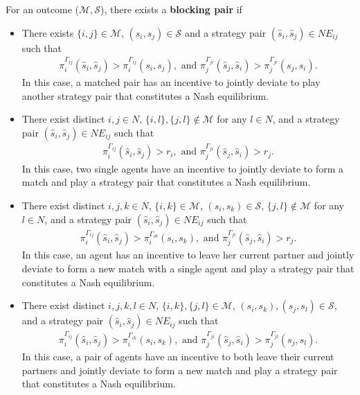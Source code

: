 \documentclass{myPaper}
\begin{document}
\begin{definition} \label{def:blocking}
For an outcome ($\mathcal{M}, \mathcal{S}$), there exists a \textbf{blocking pair} if
\begin{itemize}
    \item[(a)] There exists $\{i, j\} \in \mathcal{M}$, $(s_i, s_j) \in \mathcal{S}$ and a strategy pair $(\hat{s}_i,\hat{s}_j)\in NE_{ij}$ such that 
    \begin{eqnarray}
     \pi_i^{\Gamma_{ij}}(\hat{s}_i, \hat{s}_j)>\pi_i^{\Gamma_{ij}}(s_i, s_j), \text{ and } \pi_j^{\Gamma_{ji}}(\hat{s}_j, \hat{s}_i)>\pi_j^{\Gamma_{ji}}(s_j, s_i). \nonumber
\end{eqnarray}
In this case, a matched pair has an incentive to jointly deviate to play another strategy pair that constitutes a Nash equilibrium.

\item[(b)] There exist distinct $i, j \in N$,  $ \{i, l\}, \{j, l\} \notin \mathcal{M}$ for any $l \in N$, and a strategy pair $(\hat{s}_i,\hat{s}_j)\in NE_{ij}$ such that 
    \begin{eqnarray} \pi_i^{\Gamma_{ij}}(\hat{s}_i, \hat{s}_j)>r_i, \text{ and } \pi_j^{\Gamma_{ji}}(\hat{s}_j, \hat{s}_i)>r_j. \nonumber
\end{eqnarray}
In this case, two single agents have an incentive to jointly deviate to form a match and play a strategy pair that constitutes a Nash equilibrium.

\item[(c)] There exist distinct $i, j, k \in N$, $\{i, k\}\in \mathcal{M}$, $(s_i, s_k) \in \mathcal{S}$, $\{j, l\} \notin \mathcal{M}$ for any $l \in N$, and a strategy pair $(\hat{s}_i,\hat{s}_j)\in NE_{ij}$ such that 
    \begin{eqnarray}
 \pi_i^{\Gamma_{ij}}(\hat{s}_i, \hat{s}_j)>\pi_i^{\Gamma_{ik}}(s_i, s_k), \text{ and } \pi_j^{\Gamma_{ji}}(\hat{s}_j, \hat{s}_i)>r_j. \nonumber
\end{eqnarray}
In this case, an agent has an incentive to leave her current partner and jointly deviate to form a new match with a single agent and play a strategy pair that constitutes a Nash equilibrium.

\item[(d)] There exist distinct $i, j, k, l \in N$,  $\{i, k\}, \{j, l\} \in \mathcal{M}$, $(s_i, s_k), (s_j, s_l) \in \mathcal{S}$, and a strategy pair $(\hat{s}_i,\hat{s}_j)\in NE_{ij}$ such that
    \begin{eqnarray}
   \pi_i^{\Gamma_{ij}}(\hat{s}_i, \hat{s}_j)>\pi_i^{\Gamma_{ik}}(s_i, s_k), \text{ and } \pi_j^{\Gamma_{ji}}(\hat{s}_j, \hat{s}_i)>\pi_j^{\Gamma_{jl}}(s_j, s_l). \nonumber
\end{eqnarray}
In this case, a pair of agents have an incentive to both leave their current partners and jointly deviate to form a new match and play a  strategy pair that constitutes a Nash equilibrium.
\end{itemize}
\end{definition}
\end{document}
